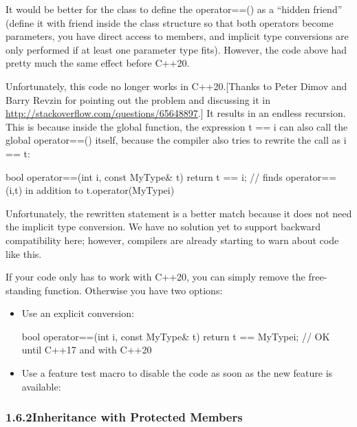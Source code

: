 It would be better for the class to define the operator==() as a “hidden friend” (define it with friend inside the class structure so that both operators become parameters, you have direct access to members, and implicit type conversions are only performed if at least one parameter type fits). However, the code above had pretty much the same effect before C++20.

Unfortunately, this code no longer works in C++20.[Thanks to Peter Dimov and Barry Revzin for pointing out the problem and discussing it in \url{http://stackoverflow.com/questions/65648897}.] It results in an endless recursion. This is because inside the global function, the expression t == i can also call the global operator==() itself, because the compiler also tries to rewrite the call as i == t:

\begin{cpp}
bool operator==(int i, const MyType& t) {
	return t == i; // finds operator==(i,t) in addition to t.operator(MyType{i})
}
\end{cpp}

Unfortunately, the rewritten statement is a better match because it does not need the implicit type conversion. We have no solution yet to support backward compatibility here; however, compilers are already starting to warn about code like this.

If your code only has to work with C++20, you can simply remove the free-standing function. Otherwise you have two options:

\begin{itemize}
\item
Use an explicit conversion:

\begin{cpp}
bool operator==(int i, const MyType& t) {
	return t == MyType{i}; // OK until C++17 and with C++20
}
\end{cpp}

\item
Use a feature test macro to disable the code as soon as the new feature is available:
\end{itemize}

\subsubsection*{ 1.6.2\hspace{0.2cm}Inheritance with Protected Members}

